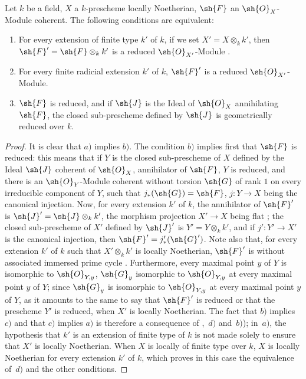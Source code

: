 \begin{proposition}[4.6.16]
\label{IV.4.6.16}
Let $k$ be a field, $X$ a $k$-prescheme locally Noetherian, $\sh{F}$ an $\sh{O}_X$-Module coherent.
The following conditions are equivalent:
\begin{enumerate}[label=\emph{\alph*)}]
  \item For every extension of finite type $k'$ of $k$, if we set $X'=X\otimes_k k'$, then $\sh{F}'=\sh{F}\otimes_k k'$ is a reduced $\sh{O}_{X'}$-Module .
  \item For every finite radicial extension $k'$ of $k$, $\sh{F}'$ is a reduced $\sh{O}_{X'}$-Module.
  \item $\sh{F}$ is reduced, and if $\sh{J}$ is the Ideal of $\sh{O}_X$ annihilating $\sh{F}$, the closed sub-prescheme defined by $\sh{J}$ is geometrically reduced over $k$.
\end{enumerate}
\end{proposition}


\begin{proof}
It is clear that $a)$ implies $b)$.
The condition $b)$ implies first that $\sh{F}$ is reduced: this means  that if $Y$ is the closed sub-prescheme of $X$ defined by the Ideal $\sh{J}$ coherent of $\sh{O}_X$, annihilator of $\sh{F}$, $Y$ is reduced, and there is an $\sh{O}_Y$-Module coherent without torsion $\sh{G}$ of rank $1$ on every irreducible component of $Y$, such that $j_*(\sh{G})=\sh{F}$, $j:Y\to X$ being the canonical injection.
Now, for every extension $k'$ of $k$, the annihilator of $\sh{F}'$ is $\sh{J}'=\sh{J}\otimes_k k'$, the morphism projection $X'\to X$ being flat ; the closed sub-prescheme of $X'$ defined by $\sh{J}'$ is $Y'=Y\otimes_k k'$, and if $j':Y'\to X'$ is the canonical injection, then $\sh{F}'=j'_*(\sh{G}')$.
Note also that, for every extension $k'$ of $k$ such that $X'\otimes_k k'$ is locally Noetherian, $\sh{F}'$ is without associated immersed prime cycle .
Furthermore, every maximal point $y$ of $Y$ is isomorphic to $\sh{O}_{Y,y}$, $\sh{G}_y$ isomorphic to $\sh{O}_{Y,y}$ at every maximal point $y$ of $Y$; since $\sh{G}_y$ is isomorphic to $\sh{O}_{Y,y}$ at every maximal point $y$ of $Y$, as it amounts to the same to say that $\sh{F}'$ is reduced or that the prescheme $Y'$ is reduced, when $X'$ is locally Noetherian.
The fact that $b)$ implies $c)$ and that $c)$ implies $a)$ is therefore a consequence of ,~$d)$ and~$b)$); in~$a)$, the hypothesis that $k'$ is an extension of finite type of $k$ is not made solely to ensure that $X'$ is locally Noetherian.
When $X$ is locally of finite type over $k$, $X$ is locally Noetherian for every extension $k'$ of $k$, which proves in this case the equivalence of~$d)$ and the other conditions.
\end{proof}

